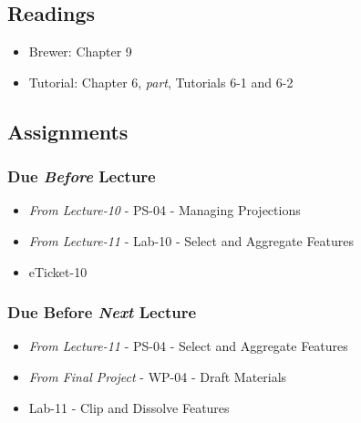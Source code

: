 \documentclass[]{book}
\providecommand{\tightlist}{%
  \setlength{\itemsep}{0pt}\setlength{\parskip}{0pt}}
\begin{document}
\hypertarget{readings-12}{%
\subsection*{Readings}\label{readings-12}}

\begin{itemize}
\tightlist
\item
  Brewer: Chapter 9
\item
  Tutorial: Chapter 6, \emph{part}, Tutorials 6-1 and 6-2
\end{itemize}

\hypertarget{assignments-13}{%
\subsection*{Assignments}\label{assignments-13}}

\hypertarget{due-before-lecture-11}{%
\subsubsection*{\texorpdfstring{Due \emph{Before} Lecture}{Due Before Lecture}}\label{due-before-lecture-11}}

\begin{itemize}
\tightlist
\item
  \emph{From Lecture-10} - PS-04 - Managing Projections
\item
  \emph{From Lecture-11} - Lab-10 - Select and Aggregate Features
\item
  eTicket-10
\end{itemize}

\hypertarget{due-before-next-lecture-10}{%
\subsubsection*{\texorpdfstring{Due Before \emph{Next} Lecture}{Due Before Next Lecture}}\label{due-before-next-lecture-10}}

\begin{itemize}
\tightlist
\item
  \emph{From Lecture-11} - PS-04 - Select and Aggregate Features
\item
  \emph{From Final Project} - WP-04 - Draft Materials
\item
  Lab-11 - Clip and Dissolve Features
\end{itemize}
\end{document}
